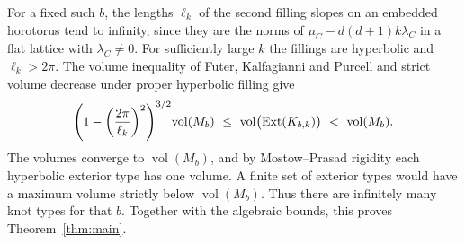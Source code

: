 For a fixed such \(b\), the lengths \(\ell_k\) of the second
filling slopes on an embedded horotorus tend to infinity, since
they are the norms of \(\mu_C-d(d+1)k\lambda_C\) in a flat
lattice with \(\lambda_C\ne0\). For sufficiently large \(k\)
the fillings are hyperbolic and \(\ell_k>2\pi\).
The volume inequality of Futer, Kalfagianni and Purcell
\cite[Theorem 1.1]{FKP} and strict volume decrease under proper
hyperbolic filling \cite[Theorem 6.5.6]{Thurston} give
\[
 \left(1-\left(\frac{2\pi}{\ell_k}\right)^2\right)^{3/2}\!
     \operatorname{vol}(M_b)
   \ \le\ \operatorname{vol}\bigl(\operatorname{Ext}(K_{b,k})\bigr)
   \ <\ \operatorname{vol}(M_b).
\]
The volumes converge to \(\operatorname{vol}(M_b)\), and by
Mostow--Prasad rigidity each hyperbolic exterior type has
one volume. A finite set of exterior types would have a
maximum volume strictly below \(\operatorname{vol}(M_b)\).
Thus there are infinitely many knot types for that \(b\).
Together with the algebraic bounds, this proves
Theorem~\ref{thm:main}.
